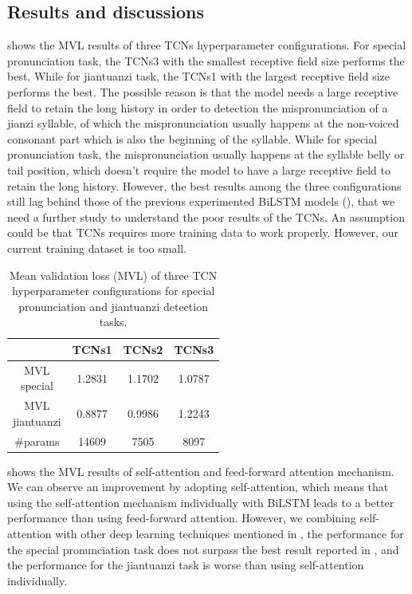 \subsection{Results and discussions}

 shows the MVL results of three TCNs hyperparameter configurations. For special pronunciation task, the TCNs3 with the smallest receptive field size performs the best. While for jiantuanzi task, the TCNs1 with the largest receptive field size performs the best. The possible reason is that the model needs a large receptive field to retain the long history in order to detection the mispronunciation of a jianzi syllable, of which the mispronunciation usually happens at the non-voiced consonant part which is also the beginning of the syllable. While for special pronunciation task, the mispronunciation usually happens at the syllable belly or tail position, which doesn't require the model to have a large receptive field to retain the long history. However, the best results among the three configurations still lag behind those of the previous experimented BiLSTM models (), that we need a further study to understand the poor results of the TCNs. An assumption could be that TCNs requires more training data to work properly. However, our current training dataset is too small.

\begin{table}[ht!]
\centering
\caption{Mean validation loss (MVL) of three TCN hyperparameter configurations for special pronunciation and jiantuanzi detection tasks.}
\label{tab:ch6:results_tcns_val}
\begin{tabular}{cccc}
\toprule
& TCNs1 & TCNs2 & TCNs3 \\
\midrule
\makecell{MVL\\special} & 1.2831 & 1.1702 & 1.0787 \\
\makecell{MVL\\jiantuanzi} & 0.8877 & 0.9986 & 1.2243 \\
\#params & 14609 & 7505 & 8097 \\
\bottomrule
\end{tabular}
\end{table}

 shows the MVL results of self-attention and feed-forward attention mechanism. We can observe an improvement by adopting self-attention, which means that using the self-attention mechanism individually with BiLSTM leads to a better performance than using feed-forward attention. However, we combining self-attention with other deep learning techniques mentioned in , the performance for the special pronunciation task does not surpass the best result reported in , and the performance for the jiantuanzi task is worse than using self-attention individually.


